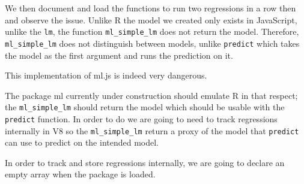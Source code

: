 \documentclass[
  10pt,
]{krantz}
\makeatletter
\newenvironment{Shaded}{\begin{snugshade}}{\end{snugshade}}
\newcommand{\CommentTok}[1]{\textcolor[rgb]{0.37,0.37,0.37}{\textit{#1}}}
\newcommand{\ControlFlowTok}[1]{\textcolor[rgb]{0.27,0.27,0.27}{\textbf{#1}}}
\newcommand{\DataTypeTok}[1]{\textcolor[rgb]{0.27,0.27,0.27}{#1}}
\newcommand{\DecValTok}[1]{\textcolor[rgb]{0.06,0.06,0.06}{#1}}
\newcommand{\KeywordTok}[1]{\textcolor[rgb]{0.27,0.27,0.27}{\textbf{#1}}}
\newcommand{\NormalTok}[1]{#1}
\newcommand{\OperatorTok}[1]{\textcolor[rgb]{0.43,0.43,0.43}{\textbf{#1}}}
\newcommand{\OtherTok}[1]{\textcolor[rgb]{0.37,0.37,0.37}{#1}}
\newcommand{\StringTok}[1]{\textcolor[rgb]{0.5,0.5,0.5}{#1}}
\newenvironment{kframe}{%
\medskip{}
\setlength{\fboxsep}{.8em}
 \def\at@end@of@kframe{}%
 \ifinner\ifhmode%
  \def\at@end@of@kframe{\end{minipage}}%
  \begin{minipage}{\columnwidth}%
 \fi\fi%
 \def\FrameCommand##1{\hskip\@totalleftmargin \hskip-\fboxsep
 \colorbox{shadecolor}{##1}\hskip-\fboxsep
     \hskip-\linewidth \hskip-\@totalleftmargin \hskip\columnwidth}%
 \MakeFramed {\advance\hsize-\width
   \@totalleftmargin\z@ \linewidth\hsize
   \@setminipage}}%
 {\par\unskip\endMakeFramed%
 \at@end@of@kframe}
\renewenvironment{Shaded}{\begin{kframe}}{\end{kframe}}
\makeatother
\begin{document}
We then document and load the functions to run two regressions in a row then and observe the issue. Unlike R the model we created only exists in JavaScript, unlike the \texttt{lm}, the function \texttt{ml\_simple\_lm} does not return the model. Therefore, \texttt{ml\_simple\_lm} does not distinguish between models, unlike \texttt{predict} which takes the model as the first argument and runs the prediction on it.

This implementation of ml.js is indeed very dangerous.

\begin{Shaded}
\end{Shaded}

The package ml currently under construction should emulate R in that respect; the \texttt{ml\_simple\_lm} should return the model which should be usable with the \texttt{predict} function. In order to do we are going to need to track regressions internally in V8 so the \texttt{ml\_simple\_lm} return a proxy of the model that \texttt{predict} can use to predict on the intended model.

In order to track and store regressions internally, we are going to declare an empty array when the package is loaded.

\begin{Shaded}
\end{Shaded}
\end{document}
